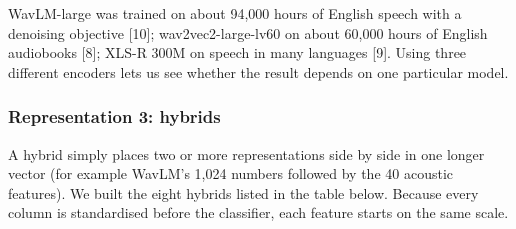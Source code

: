 \documentclass[11pt,a4paper]{article}
\begin{document}
WavLM-large was trained on about 94,000 hours of English speech with a denoising objective [10]; wav2vec2-large-lv60 on about 60,000 hours of English audiobooks [8]; XLS-R 300M on speech in many languages [9]. Using three different encoders lets us see whether the result depends on one particular model.

\subsubsection{Representation 3: hybrids}
A hybrid simply places two or more representations side by side in one longer vector (for example WavLM's 1,024 numbers followed by the 40 acoustic features). We built the eight hybrids listed in the table below. Because every column is standardised before the classifier, each feature starts on the same scale.
\end{document}
